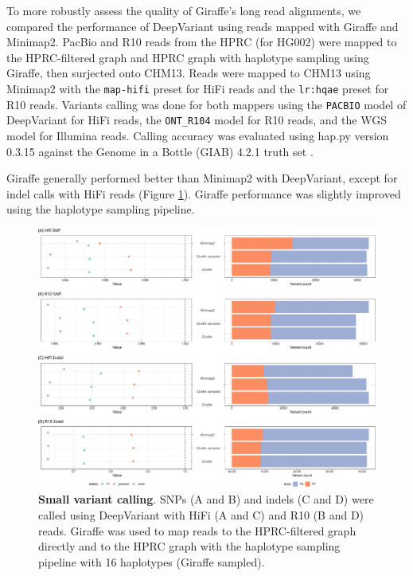 \documentclass[11pt]{ucscthesis}
\begin{document}
To more robustly assess the quality of Giraffe's long read alignments, we compared the performance of DeepVariant \citep{deep_variant_2018} using reads mapped with Giraffe and Minimap2.
PacBio and R10 reads from the HPRC (for HG002)  were mapped to the HPRC-filtered graph and HPRC graph with haplotype sampling using Giraffe, then surjected onto CHM13. 
Reads were mapped to CHM13 using Minimap2 with the \texttt{map-hifi} preset for HiFi reads and the \texttt{lr:hqae} preset for R10 reads.
Variants calling was done for both mappers using the \texttt{PACBIO} model of DeepVariant for HiFi reads, the \texttt{ONT\_R104} model for R10 reads, and the WGS model for Illumina reads. 
Calling accuracy was evaluated using hap.py version 0.3.15 \citep{happy_2020} against the Genome in a Bottle (GIAB) 4.2.1 truth set \cite{giab_benchmark_2019, giab_benchmarking_4.2.1_2022}.


Giraffe generally performed better than Minimap2 with DeepVariant, except for indel calls with HiFi reads (Figure \ref{fig:dv_calling}).
Giraffe performance was slightly improved using the haplotype sampling pipeline.

\begin{figure}[htb]
    \centering
    \includegraphics[width=\columnwidth]{lr_dv_calls.pdf}
    \caption[Long read small variant calling]{\textbf{Small variant calling}. SNPs (A and B) and indels (C and D) were called using DeepVariant with HiFi (A and C) and R10 (B and D) reads. Giraffe was used to map reads to the HPRC-filtered graph directly and to the HPRC graph with the haplotype sampling pipeline with 16 haplotypes (Giraffe sampled).}
    \label{fig:dv_calling}
\end{figure}
\end{document}
